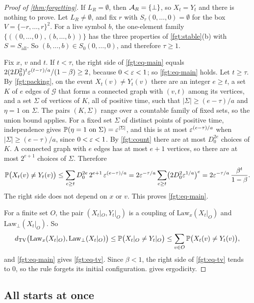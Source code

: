 \begin{proof}[Proof of \cref{thm:forgetting}]
If $L_R=\emptyset$, then $\mathcal{A}_R=\{\bot\}$, so $X_t=Y_t$ and there is nothing to prove. Let $L_R\ne\emptyset$, and fix $r$ with $S_\tau(0,\dots,0)=\emptyset$ for the box $V=\{-r,\dots,r\}^2$. For a live symbol $b$, the one-element family $\{((0,\dots,0),(b,\dots,b))\}$ has the three properties of \cref{fgt:stable}(b) with $S=S_{\mathrm{all}}$. So $(b,\dots,b)\in S_0(0,\dots,0)$, and therefore $\tau\ge1$.

Fix $x$, $v$ and $t$. If $t<\tau$, the right side of \eqref{fgt:eq-main} equals $2(2D_0^2)^t\varepsilon^{(t-\tau)/a}/(1-\beta)\ge2$, because $0<\varepsilon<1$; so \eqref{fgt:eq-main} holds. Let $t\ge\tau$. By \cref{fgt:packing}, on the event $X_t(v)\ne Y_t(v)$ there are an integer $e\ge t$, a set $K$ of $e$ edges of $\mathcal G$ that forms a connected graph with $(v,t)$ among its vertices, and a set $\Sigma$ of vertices of $K$, all of positive time, such that $|\Sigma|\ge(e-\tau)/a$ and $\eta=1$ on $\Sigma$. The pairs $(K,\Sigma)$ range over a countable family of fixed sets, so the union bound applies. For a fixed set $\Sigma$ of distinct points of positive time, independence gives $\mathbb{P}(\eta=1\text{ on }\Sigma)=\varepsilon^{|\Sigma|}$, and this is at most $\varepsilon^{(e-\tau)/a}$ when $|\Sigma|\ge(e-\tau)/a$, since $0<\varepsilon<1$. By \cref{fgt:count} there are at most $D_0^{2e}$ choices of $K$. A connected graph with $e$ edges has at most $e+1$ vertices, so there are at most $2^{e+1}$ choices of $\Sigma$. Therefore
\[
\mathbb{P}\bigl(X_t(v)\ne Y_t(v)\bigr)\le\sum_{e\ge t}D_0^{2e}\,2^{e+1}\,\varepsilon^{(e-\tau)/a}=2\varepsilon^{-\tau/a}\sum_{e\ge t}\bigl(2D_0^2\varepsilon^{1/a}\bigr)^e=2\varepsilon^{-\tau/a}\,\frac{\beta^t}{1-\beta}.
\]
The right side does not depend on $x$ or $v$. This proves \eqref{fgt:eq-main}.

For a finite set $O$, the pair $(X_t|_O,Y_t|_O)$ is a coupling of $\mathrm{Law}_x(X_t|_O)$ and $\mathrm{Law}_\bot(X_t|_O)$. So
\[
d_{\mathrm{TV}}\bigl(\mathrm{Law}_x(X_t|_O),\mathrm{Law}_\bot(X_t|_O)\bigr)\le\mathbb{P}\bigl(X_t|_O\ne Y_t|_O\bigr)\le\sum_{v\in O}\mathbb{P}\bigl(X_t(v)\ne Y_t(v)\bigr),
\]
and \eqref{fgt:eq-main} gives \eqref{fgt:eq-tv}. Since $\beta<1$, the right side of \eqref{fgt:eq-tv} tends to $0$, so the rule forgets its initial configuration.  gives ergodicity.
\end{proof}

\subsection{All starts at once}\label{fgt:sec-all}

